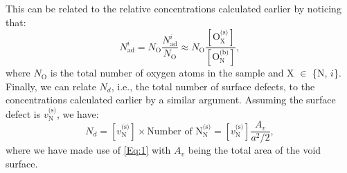 \documentclass[preprint,12pt,sort&compress]{elsarticle}
\newcommand{\?}{\stackrel{?}{=}}
\begin{document}
This can be related to the relative concentrations calculated earlier by noticing that:
\begin{equation}
N_\text{ad}^i = N_\text{O} \frac{N_\text{ad}^i}{N_\text{O}} \approx N_\text{O} \frac { [ \text{O}_\text{X}^{\text{(s)}} ] } { [ \text{O}_\text{N}^{\text{(b)}} ] },   
\label{Eq:Nad}
\end{equation}
where $N_\text{O}$ is the total number of oxygen atoms in the sample and X $\in$ \{N, $i$\}. Finally, we can relate $N_d$, i.e., the total number of surface defects, to the concentrations calculated earlier by a similar argument. Assuming the surface defect is $v_\text{N}^{\text{(s)}}$, we have:
\begin{equation}
N_d = [ v_\text{N}^{\text{(s)}} ] \times \text{Number of N$_\text{N}^\text{(s)}$} = [ v_\text{N}^{\text{(s)}} ] \frac{A_v}{a^2 / 2}, 
\label{Eq:Nd}
\end{equation}
where we have made use of \cref{Eq:1} with $A_v$ being the total area of the void surface.
\end{document}
